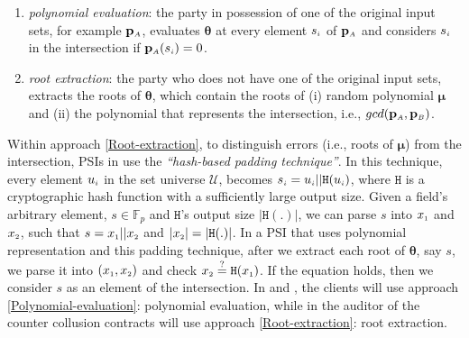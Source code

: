 \vspace{-2.4mm}
\begin{enumerate}
\item\label{Polynomial-evaluation}  \textit{polynomial evaluation}: the party in possession of one of the original input sets, for example  $\mathbf{p}_{\scriptscriptstyle A}$,  evaluates $\bm\theta$ at every element $s_{\scriptscriptstyle i}$ of $\mathbf{p}_{\scriptscriptstyle A}$ and considers $s_{\scriptscriptstyle i}$ in the intersection if $\mathbf{p}_{\scriptscriptstyle A}(s_{\scriptscriptstyle i})=0$. 

\item\label{Root-extraction}  \textit{root extraction}:   the party who does not have one of the original input sets, extracts the roots of $\bm\theta$,  which contain  the roots of (i) random polynomial  $\bm\mu$ and (ii) the polynomial that represents the intersection, i.e., $gcd(\mathbf{p}_{\scriptscriptstyle A},\mathbf{p}_{\scriptscriptstyle B})$. 
\end{enumerate}
\vspace{-4mm}
Within approach \ref{Root-extraction}, to distinguish errors (i.e., roots of $\bm\mu$) from the intersection, PSIs in \cite{eopsi,DBLP:conf/crypto/KissnerS05} use the \emph{``hash-based padding technique''}. In this technique, every element $u_{\scriptscriptstyle i}$ in the set universe $\mathcal{U}$, becomes $s_{\scriptscriptstyle i}=u_{\scriptscriptstyle i}||\mathtt{H}(u_{\scriptscriptstyle i})$, where $\mathtt{H}$ is a cryptographic hash function with a sufficiently large output size. Given a field's arbitrary element, $s \in \mathbb{F}_p$ and $\mathtt{H}$'s output size $|\mathtt{H}(.)|$, we can parse $s$ into $x_{\scriptscriptstyle 1}$ and $x_{\scriptscriptstyle 2}$, such that $s=x_{\scriptscriptstyle 1}||x_{\scriptscriptstyle 2}$ and  $|x_{\scriptscriptstyle 2}|=|\mathtt{H}(.)|$. In a  PSI that uses polynomial representation and this padding technique, after we extract each root of  $\bm\theta$, say $s$, we parse it into $(x_{\scriptscriptstyle 1}, x_{\scriptscriptstyle 2})$ and check $x_{\scriptscriptstyle 2}\stackrel{?}=\mathtt{H}(x_{\scriptscriptstyle 1})$.  If the equation holds, then we consider $s$ as an element of the intersection. In \withFai and \withRew, the clients will use approach \ref{Polynomial-evaluation}: polynomial evaluation, while in \withRew the auditor of the counter collusion contracts will use approach \ref{Root-extraction}: root extraction. 



